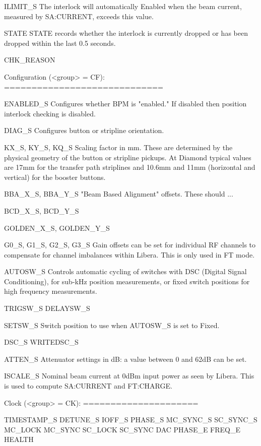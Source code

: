 \documentclass[a4paper,fleqn]{article}
\begin{document}
    ILIMIT\_S
        The interlock will automatically Enabled when the beam current,
        measured by SA:CURRENT, exceeds this value.

    STATE
        STATE records whether the interlock is currently dropped or has been
        dropped within the last 0.5 seconds.  

    CHK\_REASON


Configuration (<group> = CF):
=============================

    ENABLED\_S
        Configures whether BPM is "enabled."  If disabled then position
        interlock checking is disabled.

    DIAG\_S
        Configures button or stripline orientation.

    KX\_S, KY\_S, KQ\_S
        Scaling factor in mm.  These are determined by the physical geometry
        of the button or stripline pickups.  At Diamond typical values are
        17mm for the transfer path striplines and 10.6mm and 11mm (horizontal
        and vertical) for the booster buttons.

    BBA\_X\_S, BBA\_Y\_S
        "Beam Based Alignment" offsets.  These should ...

    BCD\_X\_S, BCD\_Y\_S

    GOLDEN\_X\_S, GOLDEN\_Y\_S

    G0\_S, G1\_S, G2\_S, G3\_S
        Gain offsets can be set for individual RF channels to compensate for
        channel imbalances within Libera.  This is only used in FT mode.

    AUTOSW\_S
        Controls automatic cycling of switches with DSC (Digital Signal
        Conditioning), for sub-kHz position measurements, or fixed switch
        positions for high frequency measurements.

    TRIGSW\_S
    DELAYSW\_S
        

    SETSW\_S
        Switch position to use when AUTOSW\_S is set to Fixed.

    DSC\_S
    WRITEDSC\_S

    ATTEN\_S
        Attenuator settings in dB: a value between 0 and 62dB can be set.

    ISCALE\_S
        Nominal beam current at 0dBm input power as seen by Libera.  This is
        used to compute SA:CURRENT and FT:CHARGE.



Clock (<group> = CK):
=====================

    TIMESTAMP\_S
    DETUNE\_S
    IOFF\_S
    PHASE\_S
    MC\_SYNC\_S
    SC\_SYNC\_S
    MC\_LOCK
    MC\_SYNC
    SC\_LOCK
    SC\_SYNC
    DAC
    PHASE\_E
    FREQ\_E
    HEALTH
\end{document}
